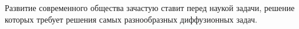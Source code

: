 \documentclass[14pt,a4paper]{extbook}
\begin{document}
\par Развитие современного общества зачастую ставит перед наукой задачи, решение которых требует решения самых разнообразных диффузионных задач. 
\end{document}
